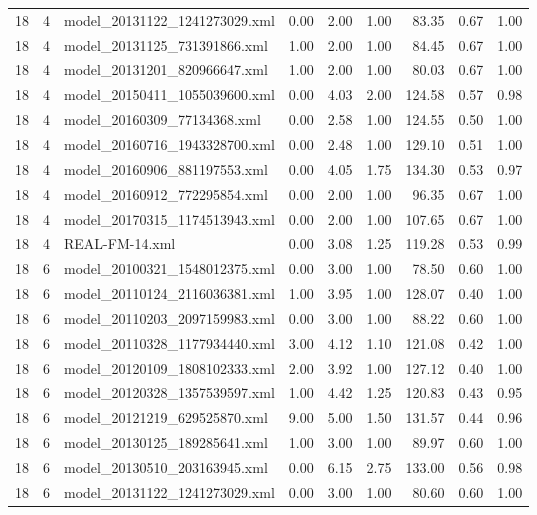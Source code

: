 \begin{table}[ht]
\begin{tabular}{rrlrrrrrr}
   18 &   4 & model\_20131122\_1241273029.xml & 0.00 & 2.00 & 1.00 & 83.35 & 0.67 & 1.00 \\ 
   18 &   4 & model\_20131125\_731391866.xml & 1.00 & 2.00 & 1.00 & 84.45 & 0.67 & 1.00 \\ 
   18 &   4 & model\_20131201\_820966647.xml & 1.00 & 2.00 & 1.00 & 80.03 & 0.67 & 1.00 \\ 
   18 &   4 & model\_20150411\_1055039600.xml & 0.00 & 4.03 & 2.00 & 124.58 & 0.57 & 0.98 \\ 
   18 &   4 & model\_20160309\_77134368.xml & 0.00 & 2.58 & 1.00 & 124.55 & 0.50 & 1.00 \\ 
   18 &   4 & model\_20160716\_1943328700.xml & 0.00 & 2.48 & 1.00 & 129.10 & 0.51 & 1.00 \\ 
   18 &   4 & model\_20160906\_881197553.xml & 0.00 & 4.05 & 1.75 & 134.30 & 0.53 & 0.97 \\ 
   18 &   4 & model\_20160912\_772295854.xml & 0.00 & 2.00 & 1.00 & 96.35 & 0.67 & 1.00 \\ 
   18 &   4 & model\_20170315\_1174513943.xml & 0.00 & 2.00 & 1.00 & 107.65 & 0.67 & 1.00 \\ 
   18 &   4 & REAL-FM-14.xml & 0.00 & 3.08 & 1.25 & 119.28 & 0.53 & 0.99 \\ 
   18 &   6 & model\_20100321\_1548012375.xml & 0.00 & 3.00 & 1.00 & 78.50 & 0.60 & 1.00 \\ 
   18 &   6 & model\_20110124\_2116036381.xml & 1.00 & 3.95 & 1.00 & 128.07 & 0.40 & 1.00 \\ 
   18 &   6 & model\_20110203\_2097159983.xml & 0.00 & 3.00 & 1.00 & 88.22 & 0.60 & 1.00 \\ 
   18 &   6 & model\_20110328\_1177934440.xml & 3.00 & 4.12 & 1.10 & 121.08 & 0.42 & 1.00 \\ 
   18 &   6 & model\_20120109\_1808102333.xml & 2.00 & 3.92 & 1.00 & 127.12 & 0.40 & 1.00 \\ 
   18 &   6 & model\_20120328\_1357539597.xml & 1.00 & 4.42 & 1.25 & 120.83 & 0.43 & 0.95 \\ 
   18 &   6 & model\_20121219\_629525870.xml & 9.00 & 5.00 & 1.50 & 131.57 & 0.44 & 0.96 \\ 
   18 &   6 & model\_20130125\_189285641.xml & 1.00 & 3.00 & 1.00 & 89.97 & 0.60 & 1.00 \\ 
   18 &   6 & model\_20130510\_203163945.xml & 0.00 & 6.15 & 2.75 & 133.00 & 0.56 & 0.98 \\ 
   18 &   6 & model\_20131122\_1241273029.xml & 0.00 & 3.00 & 1.00 & 80.60 & 0.60 & 1.00 \\ 

\end{tabular}
\end{table}

